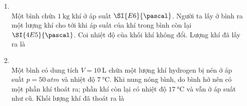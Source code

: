 \begin{enumerate}[label=\bfseries Câu \arabic*:, leftmargin=1.7cm]
\item {}\\
Một bình chứa $\SI{1}{\kilogram}$ khí ở áp suất $\SI{E6}{\pascal}$. Người ta lấy ở bình ra một lượng khí cho tới khi áp suất của khí trong bình còn lại $\SI{4E5}{\pascal}$. Coi nhiệt độ của khối khí không đổi. Lượng khí đã lấy ra là

\item {}\\
Một bình có dung tích $V=\SI{10}{\liter}$ chứa một lượng khí hydrogen bị nén ở áp suất $p=\SI{50}{atm}$ và nhiệt độ $\SI{7}{\celsius}$. Khi nung nóng bình, do bình hở nên có một phần khí thoát ra; phần khí còn lại có nhiệt độ $\SI{17}{\celsius}$ và vẫn ở áp suất như cũ. Khối lượng khí đã thoát ra là


\end{enumerate}
